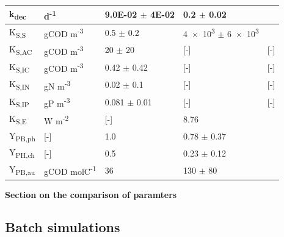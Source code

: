 \begin{table}[tp]
\begin{tabular}{@{}p{2cm} p{3cm} p{4cm} p{4cm} p{3cm} @{}}
        k\textsubscript{dec} & d\textsuperscript{-1} & \num{9.0E-02} $\pm$ \num{4E-02}& \num{0.2} $\pm$ 0.02&  \cite{Huang1999, Huang2001}\\
        \hline
        K\textsubscript{S,S} & gCOD m\textsuperscript{-3} & \num{0.5} $\pm$ \num{0.2} & \num{4e3} $\pm$ \num{6e3}& \cite{Gadhamshetty2008, Obeid2009a}\\
        K\textsubscript{S,AC} & gCOD m\textsuperscript{-3} & \num{20} $\pm$ \num{20} & [-] &[-] \\
        K\textsubscript{S,IC} & gCOD m\textsuperscript{-3} & \num{.42} $\pm$  \num{.42} & [-] &[-] \\
        K\textsubscript{S,IN} & gN m\textsuperscript{-3} &\num{0.02} $\pm$ \num{0.1} & [-]&[-] \\
        K\textsubscript{S,IP} & gP m\textsuperscript{-3} &\num{0.081} $\pm$ \num{0.01} &[-] &[-] \\
        K\textsubscript{S,E} & W m\textsuperscript{-2} & [-] & \num{8.76} & \cite{Eltsova2016} \\
        \hline
        Y\textsubscript{PB,ph} &[-] & 1.0 & \num{0.78} $\pm$ \num{0.37}& \cite{Gadhamshetty2008, Klamt2002, Klein1991, McKinlay2011, Obeid2009a, Schultz1982} \\
        Y\textsubscript{PH,ch} &[-] & \num{0.5} &\num{0.23} $\pm$ \num{0.12} &  \cite{Madigan1978, Schultz1982}\\
        Y\textsubscript{PB,au} &gCOD molC\textsuperscript{-1} &36 & 130 $\pm$ 80 & \cite{Wang1993} \\
        \bottomrule
    \end{tabular}
    \label{tab:bioparams}
\end{table}

\textbf{Section on the comparison of paramters}

\subsection{Batch simulations}

